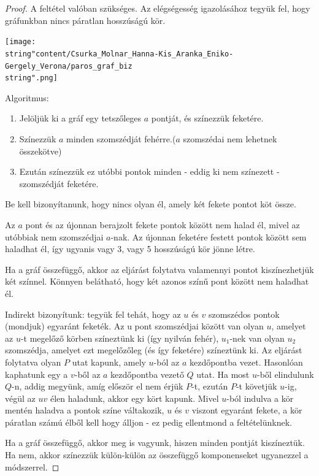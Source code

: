 \begin{proof}
	A feltétel valóban szükséges. Az elégségesség igazolásához tegyük
	fel, hogy gráfunkban nincs páratlan hosszúságú kör. 
	\begin{center}
		\texttt{[image: \\string"content/Csurka\_Molnar\_Hanna-Kis\_Aranka\_Eniko-Gergely\_Verona/paros\_graf\_biz\\string".png]} 
		\par\end{center}
	Algoritmus: 
	\begin{enumerate}
		\item Jelöljük ki a gráf egy tetszőleges $a$ pontját, és színezzük feketére. 
		\item Színezzük $a$ minden szomszédját fehérre.($a$ szomszédai nem lehetnek
		összekötve) 
		\item Ezután színezzük ez utóbbi pontok minden - eddig ki nem színezett
		- szomszédját feketére. 
	\end{enumerate}
	Be kell bizonyítanunk, hogy nincs olyan él, amely két fekete pontot
	köt össze.
	
	Az $a$ pont és az újonnan berajzolt fekete pontok között nem halad
	él, mivel az utóbbiak nem szomszédjai $a$-nak. Az újonnan feketére
	festett pontok között sem haladhat él, így ugyanis vagy 3, vagy 5
	hosszúságú kör jönne létre.
	
	Ha a gráf összefüggő, akkor az eljárást folytatva valamennyi pontot
	kiszínezhetjük két színnel. Könnyen belátható, hogy két azonos színű
	pont között nem haladhat él.
	
	\smallskip{}
	
	Indirekt bizonyítunk: tegyük fel tehát, hogy az $u$ és $v$ szomszédos
	pontok (mondjuk) egyaránt feketék. Az u pont szomszédjai között van
	olyan $u$, amelyet az $u$-t megelőző körben színeztünk ki (így nyilván
	fehér), $u_{1}$-nek van olyan $u_{2}$ szomszédja, amelyet ezt megelőzőleg
	(és így feketére) színeztünk ki. Az eljárást folytatva olyan $P$
	utat kapunk, amely $u$-ból az $a$ kezdőpontba vezet. Hasonlóan kaphatunk
	egy a $v$-ből az $a$ kezdőpontba vezető $Q$ utat. Ha most $u$-ből
	elindulunk $Q$-n, addig megyünk, amíg először el nem érjük $P$-t,
	ezután $P$-t követjük $u$-ig, végül az $uv$ élen haladunk, akkor
	egy kört kapunk. Mivel $u$-ból indulva a kör mentén haladva a pontok
	színe váltakozik, $u$ és $v$ viszont egyaránt fekete, a kör páratlan
	számú élből kell hogy álljon - ez pedig ellentmond a feltételünknek.
	
	Ha a gráf összefüggő, akkor meg is vagyunk, hiszen minden pontját
	kiszíneztük. Ha nem, akkor színezzük külön-külön az összefüggő komponenseket
	ugyanezzel a módszerrel. 
\end{proof}
